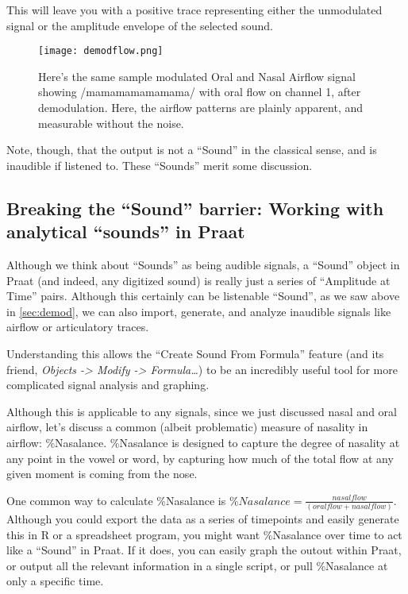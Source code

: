 \documentclass[11pt]{article}
\begin{document}
This will leave you with a positive trace representing either the
unmodulated signal or the amplitude envelope of the selected sound.

\begin{figure}
  \centerline{
    \mbox{\texttt{[image: demodflow.png]}}
  }
  \caption{Here's the same sample modulated Oral and Nasal Airflow signal showing /mamamamamamama/ with oral flow on channel 1, after demodulation. Here, the airflow patterns are plainly apparent, and measurable without the noise.}
  \label{fig:flow}
  \end{figure}

Note, though, that the output is not a ``Sound'' in the classical sense,
and is inaudible if listened to. These ``Sounds'' merit some discussion.

\hypertarget{breaking-the-sound-barrier-working-with-analytical-sounds-in-praat}{%
\subsection{Breaking the ``Sound'' barrier: Working with analytical
``sounds'' in
Praat}\label{breaking-the-sound-barrier-working-with-analytical-sounds-in-praat}}

\label{sec:soundbarrier}

Although we think about ``Sounds'' as being audible signals, a ``Sound''
object in Praat (and indeed, any digitized sound) is really just a
series of ``Amplitude at Time'' pairs. Although this certainly can be
listenable ``Sound'', as we saw above in \ref{sec:demod}, we can also
import, generate, and analyze inaudible signals like airflow or
articulatory traces.

Understanding this allows the ``Create Sound From Formula'' feature (and
its friend, \emph{Objects -\textgreater{} Modify -\textgreater{}
Formula\ldots{}}) to be an incredibly useful tool for more complicated
signal analysis and graphing.

Although this is applicable to any signals, since we just discussed
nasal and oral airflow, let's discuss a common (albeit problematic)
measure of nasality in airflow: \%Nasalance. \%Nasalance is designed to
capture the degree of nasality at any point in the vowel or word, by
capturing how much of the total flow at any given moment is coming from
the nose.

One common way to calculate \%Nasalance is
\(\%Nasalance=\frac{nasal flow}{(oral flow + nasal flow)}\). Although
you could export the data as a series of timepoints and easily generate
this in R or a spreadsheet program, you might want \%Nasalance over time
to act like a ``Sound'' in Praat. If it does, you can easily graph the
outout within Praat, or output all the relevant information in a single
script, or pull \%Nasalance at only a specific time.
\end{document}
